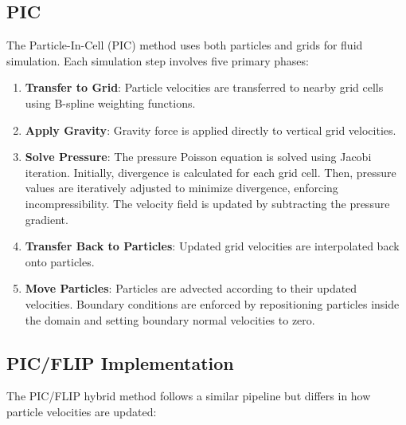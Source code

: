 \subsection{PIC}

The Particle-In-Cell (PIC) method uses both particles and grids for fluid simulation. Each simulation step involves five primary phases:

\begin{enumerate}
\item \textbf{Transfer to Grid}: Particle velocities are transferred to nearby grid cells using B-spline weighting functions.

\item \textbf{Apply Gravity}: Gravity force is applied directly to vertical grid velocities.

\item \textbf{Solve Pressure}: The pressure Poisson equation is solved using Jacobi iteration. Initially, divergence is calculated for each grid cell. Then, pressure values are iteratively adjusted to minimize divergence, enforcing incompressibility. The velocity field is updated by subtracting the pressure gradient.

\item \textbf{Transfer Back to Particles}: Updated grid velocities are interpolated back onto particles.

\item \textbf{Move Particles}: Particles are advected according to their updated velocities. Boundary conditions are enforced by repositioning particles inside the domain and setting boundary normal velocities to zero.
\end{enumerate}

\subsection{PIC/FLIP Implementation}

The PIC/FLIP hybrid method follows a similar pipeline but differs in how particle velocities are updated:

